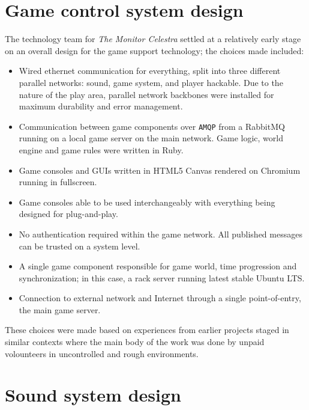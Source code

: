
\section{Game control system design}
\label{sec:game-control-system}

The technology team for \emph{The Monitor Celestra} settled at a
relatively early stage on an overall design for the game support
technology; the choices made included:
\begin{itemize}
\item Wired ethernet communication for everything, split into three
  different parallel networks: sound, game system, and player hackable. Due to the nature of the 
  play area, parallel network backbones were installed for maximum durability and error management.
\item Communication between game components over \texttt{AMQP} from a RabbitMQ running on a local
game server on the main network. Game logic, world engine and game rules were written in Ruby.
\item Game consoles and GUIs written in HTML5 Canvas rendered on Chromium running in fullscreen.
\item Game consoles able to be used interchangeably with everything being designed for plug-and-play.
\item No authentication required within the game network. All published messages can be trusted on a system level. 
\item A single game component responsible for game world, time progression and synchronization; in this case, a rack server running latest stable Ubuntu LTS\@.
\item Connection to external network and Internet through a single point-of-entry, the main game server.
\end{itemize}

These choices were made based on experiences from earlier projects staged
in similar contexts where the main body of the work was done by unpaid volounteers
in uncontrolled and rough environments.


\section{Sound system design}
\label{sec:sound-system-design}

